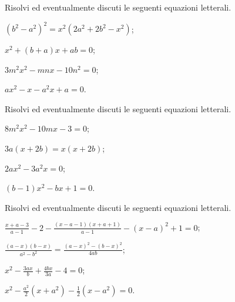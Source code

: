 \begin{esercizio}[\Ast]
 \label{ese:3.63} %
Risolvi ed eventualmente discuti le seguenti equazioni letterali.
\begin{multicols}{2}
\begin{enumeratea}
\item $\left(b^{2}-a^{2}\right)^{2}=x^{2}\left(2a^{2}+2b^{2}-x^{2}\right)$;
\item $x^{2}+(b+a)x+ab=0$;
\item $3m^{2}x^{2}-mnx-10n^{2}=0$;
\item $ax^{2}-x-a^{2}x+a=0$.
\end{enumeratea}
\end{multicols}
\end{esercizio}

\begin{esercizio}[\Ast]
 \label{ese:3.64} %
Risolvi ed eventualmente discuti le seguenti equazioni letterali.
\begin{multicols}{2}
\begin{enumeratea}
\item $8m^{2}x^{2}-10mx-3=0$;
\item $3a(x+2b)=x(x+2b)$;
\item $2ax^{2}-3a^{2}x=0$;
\item $(b-1)x^{2}-bx+1=0$.
\end{enumeratea}
\end{multicols}
\end{esercizio}

\begin{esercizio}[\Ast]
 \label{ese:3.65} %
Risolvi ed eventualmente discuti le seguenti equazioni letterali.
\begin{enumeratea}
\item $\frac{x+a-3}{a-1}-2-\frac{(x-a-1)(x+a+1)}{a-1}-(x-a)^{2}+1=0$;
\item $\frac{(a-x)(b-x)}{a^{2}-b^{2}}=\frac{(a-x)^{2}-(b-x)^{2}}{4ab}$;
\item $x^{2}-\frac{3ax}{b}+\frac{4bx}{3a}-4=0$;
\item $x^{2}-\frac{a^{2}}{2}\left(x+a^{2}\right)-\frac{1}{2}\left(x-a^{2}\right)=0$.
\end{enumeratea}
\end{esercizio}

